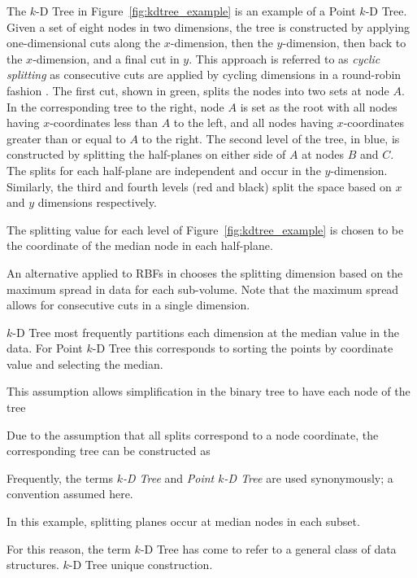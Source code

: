 \documentclass{report}
\begin{document}
The $k$-D Tree in Figure~\ref{fig:kdtree_example} is an example of a Point $k$-D Tree. Given a set of eight nodes in two dimensions, the tree is constructed by applying one-dimensional cuts along the $x$-dimension, then the $y$-dimension, then back to the $x$-dimension, and a final cut in $y$. This approach is referred to as \emph{cyclic splitting} as consecutive cuts are applied by cycling dimensions in a round-robin fashion \cite{Samet2005}. The first cut, shown in green, splits the nodes into two sets at node $A$. In the corresponding tree to the right, node $A$ is set as the root with all nodes having $x$-coordinates less than $A$ to the left, and all nodes having $x$-coordinates greater than or equal to $A$ to the right. The second level of the tree, in blue, is constructed by splitting the half-planes on either side of $A$ at nodes $B$ and $C$. The splits for each half-plane are independent and occur in the $y$-dimension. Similarly, the third and fourth levels (red and black) split the space based on $x$ and $y$ dimensions respectively.    

The splitting value for each level of Figure~\ref{fig:kdtree_example} is chosen to be the coordinate of the median node in each half-plane. 

An alternative applied to RBFs in \cite{WendlandBook} chooses the splitting dimension based on the maximum spread in data for each sub-volume. Note that the maximum spread allows for consecutive cuts in a single dimension. 
 

$k$-D Tree most frequently partitions each dimension at the median value in the data. For Point $k$-D Tree this corresponds to sorting the points by coordinate value and selecting the median. 



This assumption allows simplification in the binary tree to have each node of the tree 




Due to the assumption that all splits correspond to a node coordinate, the corresponding tree can be constructed as 


Frequently, the terms \emph{$k$-D Tree} and \emph{Point $k$-D Tree} are used synonymously; a convention assumed here. 


In this example, splitting planes occur at median nodes in each subset. 





 For this reason, the term $k$-D Tree has come to refer to a general class of data structures. 
$k$-D Tree  unique construction. 
\end{document}

